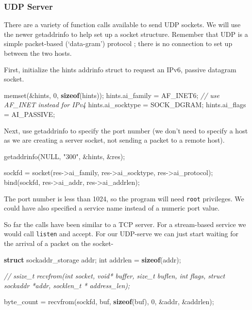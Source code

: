 \documentclass[]{article}
\newenvironment{Shaded}{}{}
\newcommand{\KeywordTok}[1]{\textcolor[rgb]{0.00,0.44,0.13}{\textbf{{#1}}}}
\newcommand{\DataTypeTok}[1]{\textcolor[rgb]{0.56,0.13,0.00}{{#1}}}
\newcommand{\DecValTok}[1]{\textcolor[rgb]{0.25,0.63,0.44}{{#1}}}
\newcommand{\StringTok}[1]{\textcolor[rgb]{0.25,0.44,0.63}{{#1}}}
\newcommand{\CommentTok}[1]{\textcolor[rgb]{0.38,0.63,0.69}{\textit{{#1}}}}
\newcommand{\NormalTok}[1]{{#1}}
\begin{document}
\subsubsection{UDP Server}\label{how-do-i-create-a-udp-server}

There are a variety of function calls available to send UDP sockets. We
will use the newer getaddrinfo to help set up a socket structure.
Remember that UDP is a simple packet-based (`data-gram') protocol ;
there is no connection to set up between the two hosts.

First, initialize the hints addrinfo struct to request an IPv6, passive
datagram socket.

\begin{Shaded}
\begin{Highlighting}[]
\NormalTok{memset(&hints, }\DecValTok{0}\NormalTok{, }\KeywordTok{sizeof}\NormalTok{(hints));}
\NormalTok{hints.ai_family = AF_INET6; }\CommentTok{// use AF_INET instead for IPv4}
\NormalTok{hints.ai_socktype =  SOCK_DGRAM;}
\NormalTok{hints.ai_flags =  AI_PASSIVE;}
\end{Highlighting}
\end{Shaded}

Next, use getaddrinfo to specify the port number (we don't need to
specify a host as we are creating a server socket, not sending a packet
to a remote host).

\begin{Shaded}
\begin{Highlighting}[]
\NormalTok{getaddrinfo(NULL, }\StringTok{"300"}\NormalTok{, &hints, &res);}

\NormalTok{sockfd = socket(res->ai_family, res->ai_socktype, res->ai_protocol);}
\NormalTok{bind(sockfd, res->ai_addr, res->ai_addrlen);}
\end{Highlighting}
\end{Shaded}

The port number is less than 1024, so the program will need
\texttt{root} privileges. We could have also specified a service name
instead of a numeric port value.

So far the calls have been similar to a TCP server. For a stream-based
service we would call \texttt{listen} and accept. For our UDP-serve we
can just start waiting for the arrival of a packet on the socket-

\begin{Shaded}
\begin{Highlighting}[]
\KeywordTok{struct} \NormalTok{sockaddr_storage addr;}
\DataTypeTok{int} \NormalTok{addrlen = }\KeywordTok{sizeof}\NormalTok{(addr);}

\CommentTok{// ssize_t recvfrom(int socket, void* buffer, size_t buflen, int flags, struct sockaddr *addr, socklen_t * address_len);}

\NormalTok{byte_count = recvfrom(sockfd, buf, }\KeywordTok{sizeof}\NormalTok{(buf), }\DecValTok{0}\NormalTok{, &addr, &addrlen);}
\end{Highlighting}
\end{Shaded}
\end{document}
